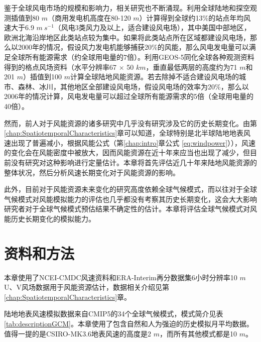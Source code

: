 鉴于全球风电市场的规模和影响力，相关研究也不断涌现。\citet{archer2005evaluation}利用全球陆地和探空观测插值到80 $m$（商用发电机高度在80-120 $m$）计算得到全球约13\%的站点年均风速大于6.9 $m ~ s^{-1}$（风电3类风力及以上，适合建设风电场），其中美国中部地区，欧洲北海沿岸地区此类站点较为集中。如果将此类站点所在区域都建设风电场，那么以2000年的情况，假设风力发电机能够捕获20\%的风能，那么风电发电量可以满足全球所有能源需求（约全球用电量的7倍）。\citet{lu2009global}利用GEOS-5同化全球各种观测资料得到的格点风场资料（水平分辨率67 $\times$ 50 $km$，垂直最低两层的高度约为71 $m$和201 $m$）插值到100 $m$计算全球陆地风能资源。若去除掉不适合建设风电场的城市、森林、冰川，其他地区全部建设风电场，假设风电场的效率为20\%，那么以2006年的情况计算，风电发电量可以超过全球所有能源需求的5倍（全球用电量的40倍）。

然而，前人对于风能资源的诸多研究中几乎没有研究涉及它的历史长期变化。由第\ref{chap:SpatiotemporalCharacteristics}章可以知道，全球特别是北半球陆地地表风速出现了普遍减小，根据风能公式（第\ref{chap:intro}章公式 \ref{eq:windpower}）），风速的变化会在风能密度中被放大，因而风能资源在近十年来应当也出现了减少，但目前没有研究对这种影响进行定量估计。本章将首先评估近几十年来陆地风能资源的整体状况，然后分析风速长期变化对于风能资源的影响。

此外，目前对于风能资源未来变化的研究高度依赖全球气候模式\citep{pryor2011assessing, karnauskas2018southward}，而以往对于全球气候模式对风能模拟能力的评估也几乎都没有考察其历史长期变化，这会大大影响研究者对于全球气候模式预估结果不确定性的估计。本章将评估全球气候模式对风能历史长期变化的模拟能力。

\section{资料和方法}

本章使用了NCEI-CMDC风速资料和ERA-Interim再分数据集6小时分辨率10 $m$ U、V风场数据用于风能资源估计，数据相关介绍见第\ref{chap:SpatiotemporalCharacteristics}章。

陆地地表风速模拟数据来自CMIP5的34个全球气候模式，模式简介见表 \ref{tab:descriptionGCM}。本章使用了包含自然和人为强迫的历史模拟月平均数据。值得一提的是CSIRO-MK3.6地表风速的高度是2 $m$，而所有其他模式都是10 $m$。


